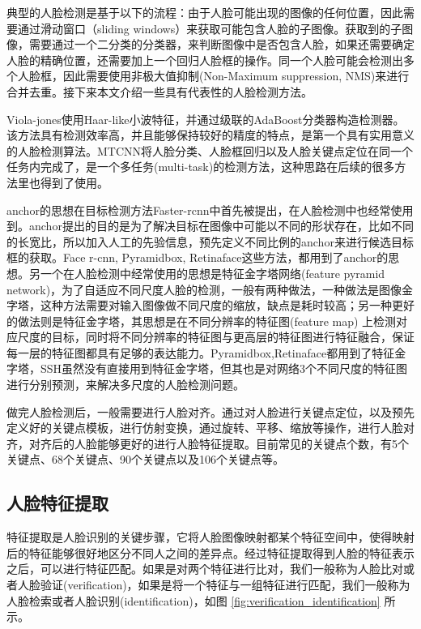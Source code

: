 \documentclass[graybox,envcountchap,sectrefs]{svmono}
\begin{document}
典型的人脸检测是基于以下的流程：由于人脸可能出现的图像的任何位置，因此需要通过滑动窗口（sliding windows）来获取可能包含人脸的子图像。获取到的子图像，需要通过一个二分类的分类器，来判断图像中是否包含人脸，如果还需要确定人脸的精确位置，还需要加上一个回归人脸框的操作。同一个人脸可能会检测出多个人脸框，因此需要使用非极大值抑制(Non-Maximum suppression, NMS)来进行合并去重。接下来本文介绍一些具有代表性的人脸检测方法。

Viola-jones\cite{viola2001rapid}使用Haar-like小波特征，并通过级联的AdaBoost分类器构造检测器。该方法具有检测效率高，并且能够保持较好的精度的特点，是第一个具有实用意义的人脸检测算法。MTCNN\cite{zhang2016joint}将人脸分类、人脸框回归以及人脸关键点定位在同一个任务内完成了，是一个多任务(multi-task)的检测方法，这种思路在后续的很多方法里也得到了使用。

anchor的思想在目标检测方法Faster-rcnn\cite{ren2015faster}中首先被提出，在人脸检测中也经常使用到。anchor提出的目的是为了解决目标在图像中可能以不同的形状存在，比如不同的长宽比，所以加入人工的先验信息，预先定义不同比例的anchor来进行候选目标框的获取。Face r-cnn\cite{wang2017face}, Pyramidbox\cite{tang2018pyramidbox}, Retinaface\cite{deng2019retinaface}这些方法，都用到了anchor的思想。另一个在人脸检测中经常使用的思想是特征金字塔网络(feature pyramid network)，为了自适应不同尺度人脸的检测，一般有两种做法，一种做法是图像金字塔，这种方法需要对输入图像做不同尺度的缩放，缺点是耗时较高；另一种更好的做法则是特征金字塔，其思想是在不同分辨率的特征图(feature map) 上检测对应尺度的目标，同时将不同分辨率的特征图与更高层的特征图进行特征融合，保证每一层的特征图都具有足够的表达能力。Pyramidbox,Retinaface都用到了特征金字塔，SSH\cite{najibi2017ssh}虽然没有直接用到特征金字塔，但其也是对网络3个不同尺度的特征图进行分别预测，来解决多尺度的人脸检测问题。

做完人脸检测后，一般需要进行人脸对齐。通过对人脸进行关键点定位，以及预先定义好的关键点模板，进行仿射变换，通过旋转、平移、缩放等操作，进行人脸对齐，对齐后的人脸能够更好的进行人脸特征提取。目前常见的关键点个数，有5个关键点、68个关键点、90个关键点以及106个关键点等。

\subsection{人脸特征提取}
特征提取是人脸识别的关键步骤，它将人脸图像映射都某个特征空间中，使得映射后的特征能够很好地区分不同人之间的差异点。经过特征提取得到人脸的特征表示之后，可以进行特征匹配。如果是对两个特征进行比对，我们一般称为人脸比对或者人脸验证(verification)，如果是将一个特征与一组特征进行匹配，我们一般称为人脸检索或者人脸识别(identification)，如图 \ref{fig:verification_identification} 所示。
\end{document}
